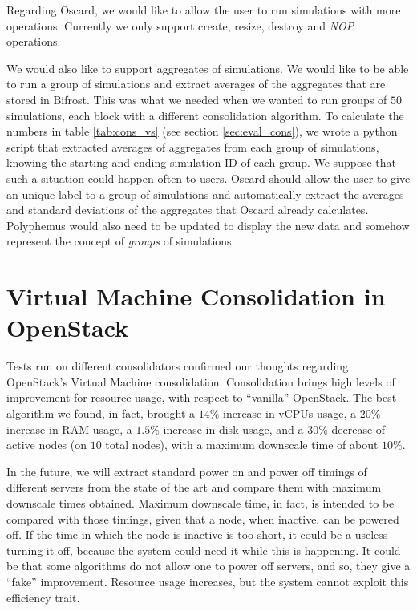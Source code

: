 Regarding Oscard, we would like to allow the user to run simulations with more operations. Currently we only support create, resize, destroy and \textit{NOP} operations.

We would also like to support aggregates of simulations. We would like to be able to run a group of simulations and extract averages of the aggregates that are stored in Bifrost. This was what we needed when we wanted to run groups of $50$ simulations, each block with a different consolidation algorithm. To calculate the numbers in table \ref{tab:cons_vs} (see section \ref{sec:eval_cons}), we wrote a python script that extracted averages of aggregates from each group of simulations, knowing the starting and ending simulation ID of each group. We suppose that such a situation could happen often to users. Oscard should allow the user to give an unique label to a group of simulations and automatically extract the averages and standard deviations of the aggregates that Oscard already calculates. Polyphemus would also need to be updated to display the new data and somehow represent the concept of \emph{groups} of simulations.

\section{Virtual Machine Consolidation in OpenStack}
\label{sec:conc_cons}
Tests run on different consolidators confirmed our thoughts regarding OpenStack's Virtual Machine consolidation. Consolidation brings high levels of improvement for resource usage, with respect to ``vanilla'' OpenStack. The best algorithm we found, in fact, brought a $14\%$ increase in vCPUs usage, a $20\%$ increase in RAM usage, a $1.5\%$ increase in disk usage, and a $30\%$ decrease of active nodes (on $10$ total nodes), with a maximum downscale time of about $10\%$.

In the future, we will extract standard power on and power off timings of different servers from the state of the art and compare them with maximum downscale times obtained. Maximum downscale time, in fact, is intended to be compared with those timings, given that a node, when inactive, can be powered off. If the time in which the node is inactive is too short, it could be a useless turning it off, because the system could need it while this is happening. It could be that some algorithms do not allow one to power off servers, and so, they give a ``fake'' improvement. Resource usage increases, but the system cannot exploit this efficiency trait.

